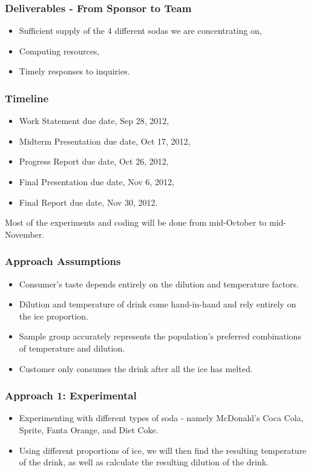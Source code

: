 \documentclass[compress,handout,10pt]{beamer}
\let\olditem\item
\renewcommand{\item}{\setlength{\itemsep}{0.5\baselineskip}\olditem}
\begin{document}
\begin{frame}
    \frametitle{Deliverables - From Sponsor to Team}

\begin{itemize}
    \item Sufficient supply of the 4 different sodas we are concentrating on,
    \item Computing resources,
    \item Timely responses to inquiries.
\end{itemize}
\end{frame}

\begin{frame}
    \frametitle{Timeline}
\begin{itemize}
    \item Work Statement due date, Sep 28, 2012,
    \item Midterm Presentation due date, Oct 17, 2012,
    \item Progress Report due date, Oct 26, 2012,
    \item Final Presentation due date, Nov 6, 2012,
    \item Final Report due date, Nov 30, 2012.
\end{itemize}
\vspace{6pt} Most of the experiments and coding will be done from mid-October to mid-November.
\end{frame}


\begin{frame}
    \frametitle{Approach Assumptions}

\begin {itemize}
\item Consumer's taste depends entirely on the dilution and temperature factors.
\item Dilution and temperature of drink come hand-in-hand and rely entirely on the ice proportion.
\item Sample group accurately represents the population's preferred combinations of temperature and dilution.
\item Customer only consumes the drink after all the ice has melted.
\end{itemize}
\end{frame}

\begin{frame}
    \frametitle{Approach 1: Experimental}

\begin {itemize}
\item Experimenting with different types of soda - namely  McDonald's Coca Cola, Sprite, Fanta Orange, and Diet Coke.
\item Using different proportions of ice, we will then find the resulting temperature of the drink, as well as calculate the resulting dilution of the drink. 

\end{itemize}

\end{frame}
\end{document}
